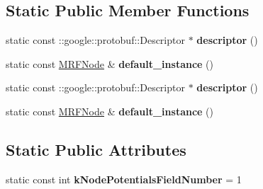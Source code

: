 \subsection*{Static Public Member Functions}
\begin{DoxyCompactItemize}
\item 
\hypertarget{classgraph_1_1MRFNode_a9113f9380142dd1d81da98fe6f4fe39a}{
static const ::google::protobuf::Descriptor $\ast$ {\bfseries descriptor} ()}
\label{classgraph_1_1MRFNode_a9113f9380142dd1d81da98fe6f4fe39a}

\item 
\hypertarget{classgraph_1_1MRFNode_a982ba58ef804dc31513eec1d1639e0c9}{
static const \hyperlink{classgraph_1_1MRFNode}{MRFNode} \& {\bfseries default\_\-instance} ()}
\label{classgraph_1_1MRFNode_a982ba58ef804dc31513eec1d1639e0c9}

\item 
\hypertarget{classgraph_1_1MRFNode_af65ea7eb633a923f3edb6731d87bc3e0}{
static const ::google::protobuf::Descriptor $\ast$ {\bfseries descriptor} ()}
\label{classgraph_1_1MRFNode_af65ea7eb633a923f3edb6731d87bc3e0}

\item 
\hypertarget{classgraph_1_1MRFNode_ae314d61e7dc907091eb1d67d665888b7}{
static const \hyperlink{classgraph_1_1MRFNode}{MRFNode} \& {\bfseries default\_\-instance} ()}
\label{classgraph_1_1MRFNode_ae314d61e7dc907091eb1d67d665888b7}

\end{DoxyCompactItemize}
\subsection*{Static Public Attributes}
\begin{DoxyCompactItemize}
\item 
\hypertarget{classgraph_1_1MRFNode_a8c72fb8318df08ad3774c388ad62296c}{
static const int {\bfseries kNodePotentialsFieldNumber} = 1}
\label{classgraph_1_1MRFNode_a8c72fb8318df08ad3774c388ad62296c}

\end{DoxyCompactItemize}
